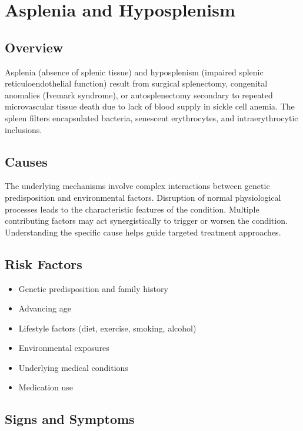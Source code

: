 \chapter{Asplenia and Hyposplenism}
\label{sec:Asplenia and Hyposplenism}

\section{Overview}
Asplenia (absence of splenic tissue) and hyposplenism (impaired splenic reticuloendothelial function) result from surgical splenectomy, congenital anomalies (Ivemark syndrome), or autosplenectomy secondary to repeated microvascular tissue death due to lack of blood supply in sickle cell anemia. The spleen filters encapsulated bacteria, senescent erythrocytes, and intraerythrocytic inclusions.
\section{Causes}
The underlying mechanisms involve complex interactions between genetic predisposition and environmental factors. Disruption of normal physiological processes leads to the characteristic features of the condition. Multiple contributing factors may act synergistically to trigger or worsen the condition. Understanding the specific cause helps guide targeted treatment approaches.
\section{Risk Factors}


\begin{itemize}[noitemsep]
  \item Genetic predisposition and family history
  \item Advancing age
  \item Lifestyle factors (diet, exercise, smoking, alcohol)
  \item Environmental exposures
  \item Underlying medical conditions
  \item Medication use
\end{itemize}
\section{Signs and Symptoms}

